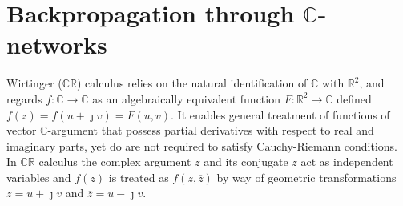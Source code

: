 \documentclass[a4paper,10pt,twocolumn]{article}
\newcommand{\real}{\mathbb{R}}
\newcommand{\cplx}{\mathbb{C}}
\newcommand{\iu}{{\jmath}}
\newcommand{\conj}[1]{\overline{#1}}
\begin{document}

\section{Backpropagation through $\cplx$-networks} %
\label{sub:wirtinger_calculus}

Wirtinger ($\cplx\real$) calculus relies on the natural identification of $\cplx$ with $
  \real^2
$, and regards $
  f\colon \cplx \to \cplx
$ as an algebraically equivalent function $F\colon \real^2 \to \cplx$ defined $
  f(z) = f(u + \iu v) = F(u, v)
$. It enables general treatment of functions of vector $\cplx$-argument that possess partial
derivatives with respect to real and imaginary parts, yet do are not required to satisfy
Cauchy-Riemann conditions. In $\cplx\real$ calculus the complex argument $z$ and its
conjugate $\conj{z}$ act as independent variables and $f(z)$ is treated as $f(z, \conj{z})$
by way of geometric transformations $z = u + \iu v$ and $\conj{z} = u - \iu v$.
\end{document}
